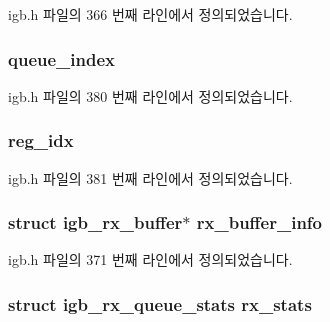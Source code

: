 igb.\+h 파일의 366 번째 라인에서 정의되었습니다.

\subsubsection[{\texorpdfstring{queue\+\_\+index}{queue_index}}]{ queue\+\_\+index}\hypertarget{structigb__ring_ae283e590c1d4204ba245b98536a7ebaa}{}\label{structigb__ring_ae283e590c1d4204ba245b98536a7ebaa}


igb.\+h 파일의 380 번째 라인에서 정의되었습니다.

\subsubsection[{\texorpdfstring{reg\+\_\+idx}{reg_idx}}]{ reg\+\_\+idx}\hypertarget{structigb__ring_a31161b15f99efdbdd33f601bb0dbab81}{}\label{structigb__ring_a31161b15f99efdbdd33f601bb0dbab81}


igb.\+h 파일의 381 번째 라인에서 정의되었습니다.

\subsubsection[{\texorpdfstring{rx\+\_\+buffer\+\_\+info}{rx_buffer_info}}]{\setlength{\rightskip}{0pt plus 5cm}struct {\bf igb\+\_\+rx\+\_\+buffer}$\ast$ rx\+\_\+buffer\+\_\+info}\hypertarget{structigb__ring_af38f66b76bb1c6753b43e578c9558e23}{}\label{structigb__ring_af38f66b76bb1c6753b43e578c9558e23}


igb.\+h 파일의 371 번째 라인에서 정의되었습니다.

\subsubsection[{\texorpdfstring{rx\+\_\+stats}{rx_stats}}]{\setlength{\rightskip}{0pt plus 5cm}struct {\bf igb\+\_\+rx\+\_\+queue\+\_\+stats} rx\+\_\+stats}\hypertarget{structigb__ring_a351b28c7fca553ca0c7523d1a9859624}{}\label{structigb__ring_a351b28c7fca553ca0c7523d1a9859624}



